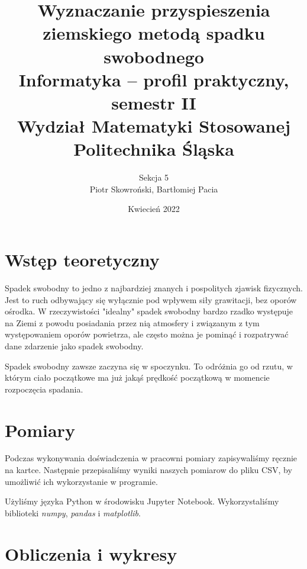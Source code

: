 \documentclass[12pt]{article}
\title{ Wyznaczanie przyspieszenia ziemskiego metodą spadku swobodnego \\
    \large Informatyka – profil praktyczny, semestr II \\
    Wydział Matematyki Stosowanej \\
    Politechnika Śląska \\}
\author{ Sekcja 5 \\
    Piotr Skowroński, Bartłomiej Pacia}
\date{Kwiecień 2022}
\begin{document}
\maketitle

\section{Wstęp teoretyczny}

Spadek swobodny to jedno z najbardziej znanych i pospolitych zjawisk fizycznych.
Jest to ruch odbywający się wyłącznie pod wpływem siły grawitacji, bez oporów
ośrodka. W rzeczywistości "idealny" spadek swobodny bardzo rzadko występuje na
Ziemi z powodu posiadania przez nią atmosfery i związanym z tym występowaniem
oporów powietrza, ale często można je pominąć i rozpatrywać dane zdarzenie jako
spadek swobodny.

Spadek swobodny zawsze zaczyna się w spoczynku. To odróżnia go od rzutu, w
którym ciało początkowe ma już jakąś prędkość początkową w momencie rozpoczęcia
spadania.

\section{Pomiary}

Podczas wykonywania doświadczenia w pracowni pomiary zapisywaliśmy ręcznie na
kartce. Następnie przepisaliśmy wyniki naszych pomiarow do pliku CSV, by
umożliwić ich wykorzystanie w programie.

Użyliśmy języka Python w środowisku Jupyter Notebook. Wykorzystaliśmy biblioteki
\textit{numpy}, \textit{pandas} i \textit{matplotlib}.

\section{Obliczenia i wykresy}
\end{document}
